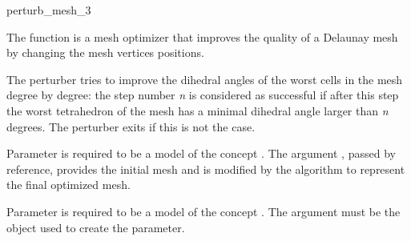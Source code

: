 \ccRefPageBegin


\begin{ccRefFunction}{perturb_mesh_3}  %


\ccDefinition
  
The function \ccRefName{} is a mesh optimizer that
 improves the quality of a Delaunay mesh
by changing the mesh vertices positions.

The perturber tries to improve the dihedral angles of the worst cells in the mesh
degree by degree: the
step  number \emph{n} is considered as successful 
if after this step the worst tetrahedron of the mesh has a minimal dihedral
angle larger than \emph{n} degrees.
The perturber exits if this is not the case.




\ccParameters

Parameter  is required to be a model of the concept
.
The argument , passed by
reference, provides the initial mesh  
and is modified  by the algorithm 
to represent the final optimized mesh.

Parameter  is required to be a model of the concept
. The argument  must be the 
object used to create the  parameter.


\end{ccRefFunction}
